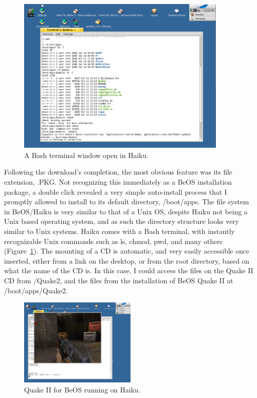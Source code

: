 \documentclass{article}
\newcommand{\figref}[1]{Figure~\ref{fig:#1}}
\begin{document}
\begin{figure}[h]
\centering
\includegraphics[width=0.9\textwidth]{figs/using-terminal.png}
\caption{A Bash terminal window open in Haiku.}
\label{fig:using-terminal}
\end{figure}

Following the download's completion, the most obvious feature was its
file extension, .PKG. Not recognizing this immediately as a BeOS
installation package, a double click revealed a very simple
auto-install process that I promptly allowed to install to its default
directory, /boot/apps.  The file system in BeOS/Haiku is very similar
to that of a Unix OS, despite Haiku not being a Unix based operating
system, and as such the directory structure looks very similar to Unix
systems.  Haiku comes with a Bash terminal, with instantly
recognizable Unix commands such as ls, chmod, pwd, and many others
(\figref{using-terminal}).  The mounting of a CD is automatic, and
very easily accessible once inserted, either from a link on the
desktop, or from the root directory, based on what the name of the CD
is.  In this case, I could access the files on the Quake II CD from
/Quake2, and the files from the installation of BeOS Quake II at
/boot/apps/Quake2.

\begin{figure}[h]
\centering
\includegraphics[width=0.5\textwidth]{figs/using-quake-play.png}
\caption{Quake II for BeOS running on Haiku.}
\label{fig:using-quake-play}
\end{figure}
	
\end{document}
